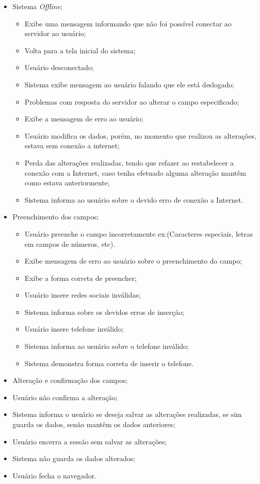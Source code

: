 {
\begin{itemize}
	\item Sistema \textit{Offline};
	   \begin{itemize}	
	   	\item Exibe uma mensagem informando que não foi possível conectar ao servidor ao usuário;
		\item Volta para a tela inicial do sistema;
		\item Usuário desconectado;
		\item Sistema exibe mensagem  ao usuário falando que ele está deslogado;
		\item Problemas com resposta do servidor ao alterar o campo especificado;
		\item Exibe a mensagem de erro ao usuário;
		\item Usuário modifica os dados, porém, no momento que realizou as alterações, estava sem conexão a internet;
		\item Perda das alterações realizadas, tendo que refazer ao restabelecer a conexão com a Internet, caso tenha efetuado alguma alteração mantêm como estava anteriormente;
		\item Sistema informa ao usuário sobre o devido erro de conexão a Internet.
     	    \end{itemize}
	\item Preenchimento dos campos;    
	    \begin{itemize}
		\item Usuário preenche o campo incorretamente ex:(Caracteres especiais, letras em campos de números, etc).
		\item Exibe mensagem de erro ao usuário sobre o preenchimento do campo;
		\item Exibe a forma correta de preencher;
		\item Usuário insere redes sociais inválidas;
		\item Sistema informa sobre os devidos erros de inserção;
		\item Usuário insere telefone inválido;
		\item Sistema informa ao usuário sobre o telefone inválido;
		\item Sistema demonstra forma correta de inserir o telefone.
	     \end{itemize}
	\item Alteração e confirmação dos campos;     
		\item Usuário não confirma a alteração;
		\item Sistema informa o usuário se deseja salvar as alterações realizadas, se sim guarda os dados, senão mantêm os dados anteriores;
		\item Usuário encerra a sessão sem salvar as alterações;
		\item Sistema não guarda os dados alterados;
		\item Usuário fecha o navegador.
\end{itemize}
}
